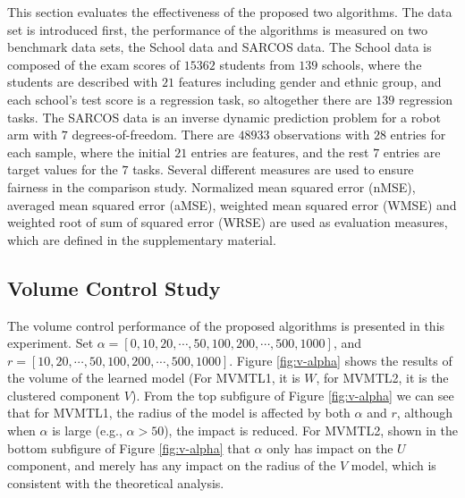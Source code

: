 \documentclass{article}
\newcounter{thm_counter}
\newcounter{lem_counter}
\newcounter{pro_counter}
\begin{document}
This section evaluates the effectiveness of the proposed two
algorithms. The data set is introduced first, the performance
of the algorithms is measured on two benchmark data sets, the School data and
SARCOS data. The School data is composed of the exam scores of
$15362$ students from $139$ schools, where the students are described
with $21$ features including gender and ethnic group, and each school's
test score is a regression task, so altogether there are $139$ regression
tasks. The SARCOS data is an inverse dynamic prediction problem
for a robot arm with $7$ degrees-of-freedom. There are $48933$ observations
with $28$ entries for each sample, where the initial $21$ entries
are features, and the rest $7$ entries are target values for the
$7$ tasks. Several different measures are used
to ensure fairness in the comparison study. Normalized mean squared error
(nMSE), averaged mean squared error (aMSE), weighted mean squared error (WMSE) and weighted root of sum of squared error (WRSE) are used as evaluation measures, which are defined in the supplementary material.


\subsection{Volume Control Study}

The volume control performance of the
proposed algorithms is presented in this experiment. Set $\alpha=[0,10,20,\cdots, 50, 100, 200, \cdots, 500, 1000]$, and $r=[10, 20, \cdots, 50, 100, 200, \cdots, 500, 1000]$. Figure \ref{fig:v-alpha} shows the results of the volume of the learned model (For MVMTL1, it is $W$, for MVMTL2, it is the clustered component $V$). From the top subfigure of Figure \ref{fig:v-alpha} we can see that for MVMTL1, the radius of the model is affected by both $\alpha$ and $r$, although when $\alpha$ is large (e.g., $\alpha>50$), the impact is reduced.  For MVMTL2, shown in the bottom subfigure of Figure \ref{fig:v-alpha} that $\alpha$ only has impact on the $U$ component, and merely has any impact on the radius of the $V$ model, which is consistent with the theoretical analysis.
\end{document}
